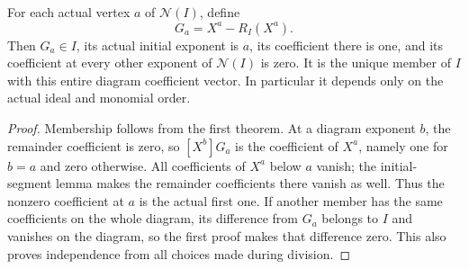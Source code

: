 \begin{theorem}
\label{hir:actual-reduced-formal-vertex-members}
\leanok
For each actual vertex $a$ of $\mathcal N(I)$, define
\[
 G_a=X^a-R_I(X^a).
\]
Then $G_a\in I$, its actual initial exponent is $a$, its coefficient
there is one, and its coefficient at every other exponent of
$\mathcal N(I)$ is zero. It is the unique member of $I$ with this entire
diagram coefficient vector. In particular it depends only on the actual
ideal and monomial order.
\end{theorem}
\begin{proof}
Membership follows from the first theorem. At a diagram exponent $b$,
the remainder coefficient is zero, so $[X^b]G_a$ is the coefficient of
$X^a$, namely one for $b=a$ and zero otherwise. All coefficients of
$X^a$ below $a$ vanish; the initial-segment lemma makes the remainder
coefficients there vanish as well. Thus the nonzero coefficient at $a$
is the actual first one. If another member has the same coefficients
on the whole diagram, its difference from $G_a$ belongs to $I$ and
vanishes on the diagram, so the first proof makes that difference zero.
This also proves independence from all choices made during division.
\end{proof}

